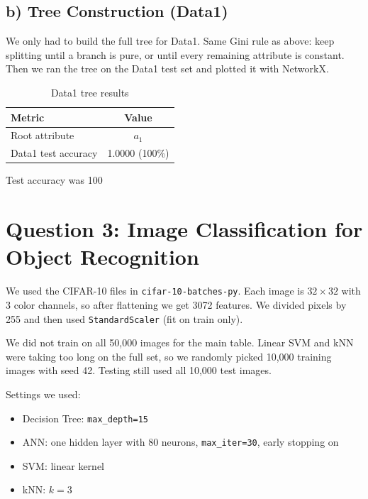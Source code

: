 \documentclass[11pt]{article}
\begin{document}
\subsection*{b) Tree Construction (Data1)}

We only had to build the full tree for Data1. Same Gini rule as above: keep splitting until a branch is pure, or until every remaining attribute is constant. Then we ran the tree on the Data1 test set and plotted it with NetworkX.

\begin{table}[h!]
\centering
\begin{tabular}{|l|c|}
\hline
\textbf{Metric} & \textbf{Value} \tabularnewline \hline
Root attribute & $a_1$ \tabularnewline \hline
Data1 test accuracy & 1.0000 (100\%) \tabularnewline \hline
\end{tabular}
\caption{Data1 tree results}
\end{table}

Test accuracy was 100%

\section*{Question 3: Image Classification for Object Recognition}

We used the CIFAR-10 files in \texttt{cifar-10-batches-py}. Each image is $32 \times 32$ with 3 color channels, so after flattening we get 3072 features. We divided pixels by 255 and then used \texttt{StandardScaler} (fit on train only).

We did not train on all 50,000 images for the main table. Linear SVM and kNN were taking too long on the full set, so we randomly picked 10,000 training images with seed 42. Testing still used all 10,000 test images.

Settings we used:
\begin{itemize}
    \item Decision Tree: \texttt{max\_depth=15}
    \item ANN: one hidden layer with 80 neurons, \texttt{max\_iter=30}, early stopping on
    \item SVM: linear kernel
    \item kNN: $k=3$
\end{itemize}
\end{document}
